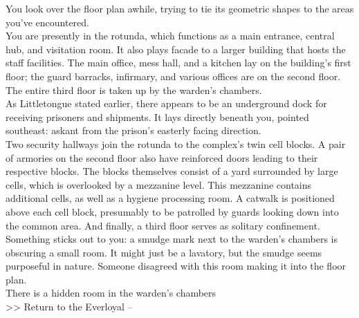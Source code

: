 You look over the floor plan awhile, trying to tie its geometric shapes to the areas you’ve encountered.\\

You are presently in the rotunda, which functions as a main entrance, central hub, and visitation room. It also plays facade to a larger building that hosts the staff facilities. The main office, mess hall, and a kitchen lay on the building’s first floor; the guard barracks, infirmary, and various offices are on the second floor. The entire third floor is taken up by the warden’s chambers.\\

As Littletongue stated earlier, there appears to be an underground dock for receiving prisoners and shipments. It lays directly beneath you, pointed southeast: askant from the prison’s easterly facing direction.\\

Two security hallways join the rotunda to the complex’s twin cell blocks. A pair of armories on the second floor also have reinforced doors leading to their respective blocks. The blocks themselves consist of a yard surrounded by large cells, which is overlooked by a mezzanine level. This mezzanine contains additional cells, as well as a hygiene processing room. A catwalk is positioned above each cell block, presumably to be patrolled by guards looking down into the common area. And finally, a third floor serves as solitary confinement.\\

Something sticks out to you: a smudge mark next to the warden’s chambers is obscuring a small room. It might just be a lavatory, but the smudge seems purposeful in nature. Someone disagreed with this room making it into the floor plan.\\
 There is a hidden room in the warden’s chambers\\

>>  Return to the Everloyal -- 